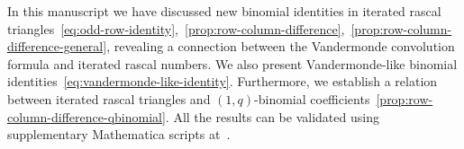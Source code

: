 In this manuscript we have discussed new binomial identities in iterated rascal
triangles~\eqref{eq:odd-row-identity},~\eqref{prop:row-column-difference},~\eqref{prop:row-column-difference-general},
revealing a connection between the Vandermonde convolution formula and iterated rascal numbers.
We also present Vandermonde-like binomial identities~\eqref{eq:vandermonde-like-identity}.
Furthermore, we establish a relation between iterated rascal triangles
and $(1,q)$-binomial coefficients~\eqref{prop:row-column-difference-qbinomial}.
All the results can be validated using supplementary Mathematica scripts at~\cite{kolosov2024identities}.
